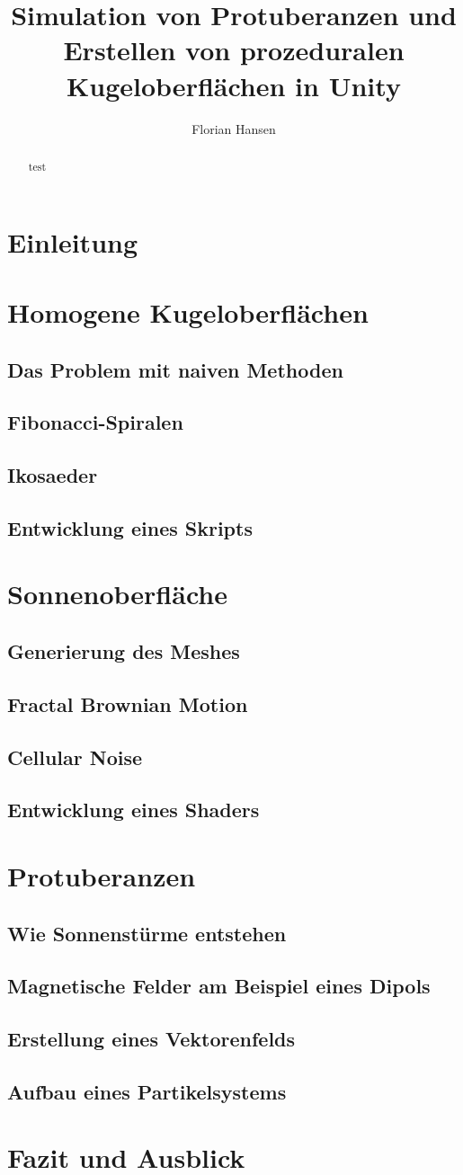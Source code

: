 \documentclass[sigconf]{acmart}
\title{Simulation von Protuberanzen und Erstellen von prozeduralen Kugeloberflächen in Unity}
\author{Florian Hansen}
\affiliation{
  \institution{Hochschule Flensburg}
}
\begin{document}
  \begin{abstract}
    test
  \end{abstract}
  \maketitle

  \section{Einleitung}
  \section{Homogene Kugeloberflächen}
  \subsection{Das Problem mit naiven Methoden}
  \subsection{Fibonacci-Spiralen}
  \subsection{Ikosaeder}
  \subsection{Entwicklung eines Skripts}
  \section{Sonnenoberfläche}
  \subsection{Generierung des Meshes} 
  \subsection{Fractal Brownian Motion}
  \subsection{Cellular Noise}
  \subsection{Entwicklung eines Shaders}
  \section{Protuberanzen}
  \subsection{Wie Sonnenstürme entstehen}
  \subsection{Magnetische Felder am Beispiel eines Dipols}
  \subsection{Erstellung eines Vektorenfelds}
  \subsection{Aufbau eines Partikelsystems}
  \section{Fazit und Ausblick}
\end{document}
